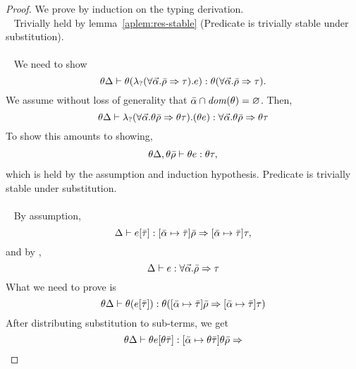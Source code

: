 \begin{proof} We prove by induction on the typing derivation.
  \\
  \case \TyQuery~ Trivially held by lemma~\ref{aplem:res-stable}
  (Predicate \unambiguous{} is trivially stable under substitution).
  \\
  \\
  \case \TyRule~ We need to show
  \begin{equation*}
    \theta \Delta \vdash
    \theta(\lambda_? (\forall \vec{\alpha}. \bar{\rho} \Rightarrow \tau). e):\theta(\forall \vec{\alpha}. \bar{\rho} \Rightarrow \tau).
  \end{equation*}
  We assume without loss of generality that $\bar{\alpha} \cap
  {\it dom }(\theta) = \varnothing$. Then,
  \begin{equation*}
    \theta \Delta \vdash
    \lambda_? (\forall \vec{\alpha}. \theta \bar{\rho} \Rightarrow \theta \tau). (\theta e):\forall \vec{\alpha}. \theta \bar{\rho} \Rightarrow \theta \tau
  \end{equation*}
  To show this amounts to showing,
  \begin{align*}
    \theta \Delta, \theta \bar{\rho} \vdash 
    \theta e:\theta \tau,
  \end{align*}
  which is held by the assumption and induction hypothesis. Predicate
  \unambiguous{} is trivially stable under substitution.
  \\
  \\
  \case \TyInst~ By assumption,
  \begin{equation*}
    \Delta \vdash
    e[\bar{\tau}]:[\bar{\alpha} \mapsto \bar{\tau}] \bar{\rho} \Rightarrow 
      [\bar{\alpha} \mapsto \bar{\tau}] \tau,
  \end{equation*}
  and by \TyInst,
  \begin{equation}
    \Delta \vdash e:\forall \vec{\alpha}. \bar{\rho} \Rightarrow \tau
    \label{eq:tyinst-pre}
  \end{equation}
  What we need to prove is
  \begin{equation*}
    \theta \Delta \vdash \theta 
    (e[\bar{\tau}]):\theta ([\bar{\alpha} \mapsto \bar{\tau}]\bar{\rho} \Rightarrow 
      [\bar{\alpha} \mapsto \bar{\tau}]\tau)
  \end{equation*}
  After distributing substitution to sub-terms, we get
  \begin{equation*}
    \theta \env \turns
    \relation{\theta e[\theta \bar{\type}]}
    {[\bar{\alpha} \mapsto \theta \bar{\type}] \theta \rulesetvar \To 
}
\end{equation*}
\end{proof}
